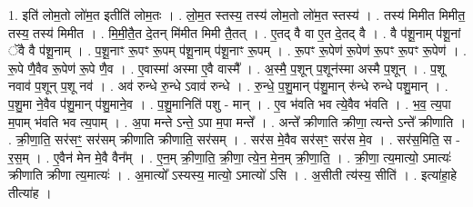 \documentclass[17pt]{extarticle}
\begin{document}
1. इति॑ लोम॒तो लो॑म॒त इतीति॑ लोम॒तः । . लो॒म॒त स्तस्य॒ तस्य॑ लोम॒तो लो॑म॒त स्तस्य॑ । . तस्य॑ मिमीत मिमीत॒ तस्य॒ तस्य॑ मिमीत । . मि॒मी॒तै॒त दे॒तन् मि॑मीत मिमी तै॒तत् । . ए॒तद् वै वा ए॒त दे॒तद् वै । . वै प॑शू॒नाम् प॑शू॒नां ॅवै वै प॑शू॒नाम् । . प॒शू॒नाꣳ रू॒पꣳ रू॒पम् प॑शू॒नाम् प॑शू॒नाꣳ रू॒पम् । . रू॒पꣳ रू॒पेण॑ रू॒पेण॑ रू॒पꣳ रू॒पꣳ रू॒पेण॑ । . रू॒पे णै॒वैव रू॒पेण॑ रू॒पे णै॒व । . ए॒वास्मा॑ अस्मा ए॒वै वास्मै᳚ । . अ॒स्मै॒ प॒शून् प॒शून॑स्मा अस्मै प॒शून् । . प॒शू नवाव॑ प॒शून् प॒शू नव॑ । . अव॑ रुन्धे रु॒न्धे ऽवाव॑ रुन्धे । . रु॒न्धे॒ प॒शु॒मान् प॑शु॒मान् रु॑न्धे रुन्धे पशु॒मान् । . प॒शु॒मा ने॒वैव प॑शु॒मान् प॑शु॒माने॒व । . प॒शु॒मानिति॑ पशु - मान् । . ए॒व भ॑वति भव त्ये॒वैव भ॑वति । . भ॒व॒ त्य॒पा म॒पाम् भ॑वति भव त्य॒पाम् । . अ॒पा मन्ते ऽन्ते॒ ऽपा म॒पा मन्ते᳚ । . अन्ते᳚ क्रीणाति क्रीणा॒ त्यन्ते ऽन्ते᳚ क्रीणाति । . क्री॒णा॒ति॒ सर॑सꣳ॒॒ सर॑सम् क्रीणाति क्रीणाति॒ सर॑सम् । . सर॑स मे॒वैव सर॑सꣳ॒॒ सर॑स मे॒व । . सर॑स॒मिति॒ स - र॒स॒म् । . ए॒वैन॑ मेन मे॒वै वैन᳚म् । . ए॒न॒म् क्री॒णा॒ति॒ क्री॒णा॒ त्ये॒न॒ मे॒न॒म् क्री॒णा॒ति॒ । . क्री॒णा॒ त्य॒मात्यो॒ ऽमात्यः॑ क्रीणाति क्रीणा त्य॒मात्यः॑ । . अ॒मात्यो᳚ ऽस्यस्य॒ मात्यो॒ ऽमात्यो॑ ऽसि । . अ॒सीती त्य॑स्य॒ सीति॑ । . इत्या॑हा॒हे तीत्या॑ह । \newline
\end{document}
